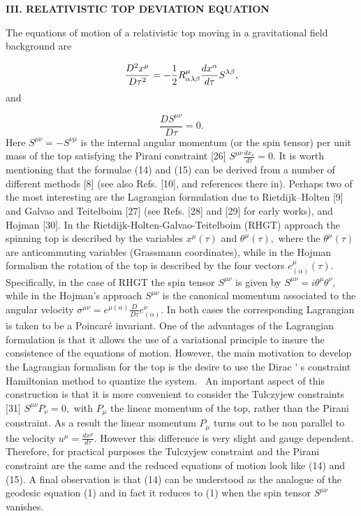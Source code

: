 \documentclass[a4paper,12pt]{article}
\begin{document}
\noindent \textbf{III. RELATIVISTIC TOP DEVIATION EQUATION}

\bigskip

The equations of motion of a relativistic top moving in a gravitational
field background are

\begin{equation}
\frac{D^{2}x^{\mu}}{D\tau^{2}}=-\frac{1}{2}R_{\alpha\lambda\beta}^{\mu}\frac{%
dx^{\alpha}}{d\tau}S^{\lambda\beta},  \label{14}
\end{equation}
and

\begin{equation}
\frac{DS^{\mu \nu }}{D\tau }=0.  \label{15}
\end{equation}
Here $S^{\mu \nu }=-S^{\nu \mu }$ is the internal angular momentum (or the
spin tensor) per unit mass of the top satisfying the Pirani constraint [26] $%
S^{\mu \nu }\frac{dx_{\nu }}{d\tau }=0$. It is worth mentioning that the
formulae (14) and (15) can be derived from a number of different methods [8]
(see also Refs. [10], and references there in). Perhaps two of the most
interesting are the Lagrangian formulation due to Rietdijk--Holten [9] and
Galvao and Teitelboim [27] (see Refs. [28] and [29] for early works), and
Hojman [30]. In the Rietdijk-Holten-Galvao-Teitelboim (RHGT) approach the
spinning top is described by the variables $x^{\mu }(\tau )$ and $\theta
^{\mu }(\tau ),$ where the $\theta ^{\mu }(\tau )$ are anticommuting
variables (Grassmann coordinates), while in the Hojman formalism the
rotation of the top is described by the four vectors $e_{(\alpha )}^{\mu
}(\tau ).$ Specifically, in the case of RHGT the spin tensor $S^{\mu \nu }$
is given by $S^{\mu \nu }=i\theta ^{\mu }\theta ^{\nu }$, while in the
Hojman's approach $S^{\mu \nu }$ is the canonical momentum associated to the
angular velocity $\sigma ^{\mu \nu }=e^{\mu (\alpha )}\frac{D}{D\tau }%
e_{(\alpha )}^{\nu }$. In both cases the corresponding Lagrangian is taken
to be a Poincar\'{e} invariant. One of the advantages of the Lagrangian
formulation is that it allows the use of a variational principle to insure
the consistence of the equations of motion. However, the main motivation to
develop the Lagrangian formalism for the top is the desire to use the Dirac%
\'{}%
s constraint Hamiltonian method to quantize the system. \ An important
aspect of this construction is that it is more convenient to consider the
Tulczyjew constraints [31] $S^{\mu \nu }P_{\nu }=0,$ with $P_{\mu }$ the
linear momentum of the top, rather than the Pirani constraint. As a result
the linear momentum $P_{\mu }$ turns out to be non parallel to the velocity $%
u^{\mu }=\frac{dx^{\mu }}{d\tau }$. However this difference is very slight
and gauge dependent. Therefore, for practical purposes the Tulczyjew
constraint and the Pirani constraint are the same and the reduced equations
of motion look like (14) and (15). A final observation is that (14) can be
understood as the analogue of the geodesic equation (1) and in fact it
reduces to (1) when the spin tensor $S^{\mu \nu }$ vanishes.
\end{document}
